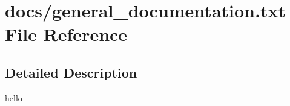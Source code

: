 \hypertarget{general__documentation_8txt}{}\section{docs/general\+\_\+documentation.txt File Reference}
\label{general__documentation_8txt}


\subsection{Detailed Description}
hello 